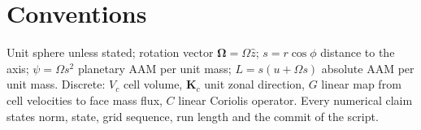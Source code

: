 \section{Conventions}
Unit sphere unless stated; rotation vector $\bm\Omega=\Omega\hat z$; $s=r\cos\phi$ distance to the axis;
$\psi=\Omega s^2$ planetary AAM per unit mass; $L=s(u+\Omega s)$ absolute AAM per unit mass.
Discrete: $V_c$ cell volume, $\bm K_c$ unit zonal direction, $G$ linear map from cell velocities to
face mass flux, $C$ linear Coriolis operator. Every numerical claim states norm, state, grid sequence,
run length and the commit of the script.
